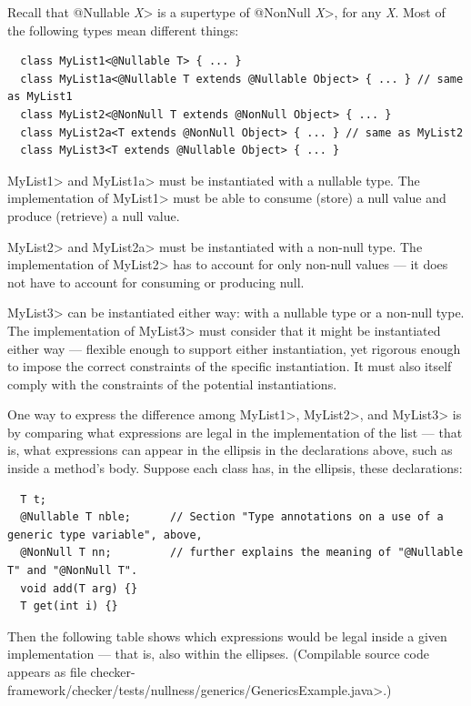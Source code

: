 
Recall that \<@Nullable \emph{X}> is a supertype of \<@NonNull \emph{X}>,
for any \emph{X}\@.
Most of the following types mean different things:

\begin{Verbatim}
  class MyList1<@Nullable T> { ... }
  class MyList1a<@Nullable T extends @Nullable Object> { ... } // same as MyList1
  class MyList2<@NonNull T extends @NonNull Object> { ... }
  class MyList2a<T extends @NonNull Object> { ... } // same as MyList2
  class MyList3<T extends @Nullable Object> { ... }
\end{Verbatim}

\<MyList1> and \<MyList1a> must be instantiated with a nullable type.
The implementation of \<MyList1> must be able to consume (store) a null
value and produce (retrieve) a null value.

\<MyList2> and \<MyList2a> must be instantiated with a non-null type.
The implementation of \<MyList2> has to account for only non-null values --- it
does not have to account for consuming or producing null.

\<MyList3> can be instantiated either way:
with a nullable type or a non-null type.  The implementation of \<MyList3> must consider
that it might be instantiated either way --- flexible enough to support either
instantiation, yet rigorous enough to impose the correct constraints of the
specific instantiation.  It must also itself comply with the constraints of
the potential instantiations.

One way to express the difference among \<MyList1>, \<MyList2>, and
\<MyList3> is by comparing what expressions are legal in the implementation
of the list --- that is, what expressions can appear in the ellipsis in the
declarations above, such as inside a method's body.  Suppose each class
has, in the ellipsis, these declarations:

\begin{Verbatim}
  T t;
  @Nullable T nble;      // Section "Type annotations on a use of a generic type variable", above,
  @NonNull T nn;         // further explains the meaning of "@Nullable T" and "@NonNull T".
  void add(T arg) {}
  T get(int i) {}
\end{Verbatim}

\noindent
Then the following table shows which expressions would be legal inside a given
implementation --- that is, also within the ellipses.
(Compilable source code appears as file
\<checker-framework/checker/tests/nullness/generics/GenericsExample.java>.)


